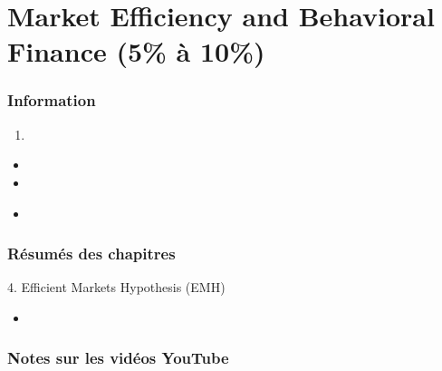 \chapter[Market Efficiency and Behavioral Finance]{Market Efficiency and Behavioral Finance (5\% à 10\%)}

\subsection{Information}

\begin{distributions}[Objective]

\end{distributions}

\begin{outcomes}
\begin{enumerate}
	\item	
\end{enumerate}
\end{outcomes}

\begin{ASM_chapter}
\begin{itemize}
	\item	{}
	\item	{}
\end{itemize}
\end{ASM_chapter}

\begin{YTB_vids}
\begin{itemize}
	\item	
\end{itemize}
\end{YTB_vids}

\subsection{Résumés des chapitres}

\begin{CHPT_SUMM_AUTO}[label = {L.-4}]{4. Efficient Markets Hypothesis (EMH)}
	\begin{itemize}
		\item	
	\end{itemize}
\end{CHPT_SUMM_AUTO}

\subsection{Notes sur les vidéos YouTube}

